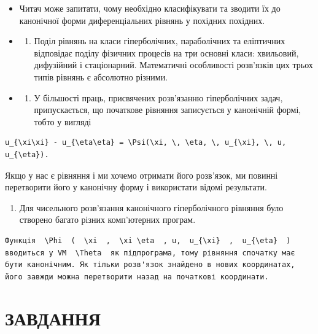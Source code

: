\documentclass[
  ukrainian,
]{article}
\providecommand{\tightlist}{%
  \setlength{\itemsep}{0pt}\setlength{\parskip}{0pt}}
\begin{document}
\begin{itemize}
\item
  Читач може запитати, чому необхідно класифікувати та зводити їх до
  канонічної форми диференціальних рівнянь у похідних похідних.
\item
  \begin{enumerate}
  \def\labelenumi{\alph{enumi})}
  \tightlist
  \item
    Поділ рівнянь на класи гіперболічних, параболічних та еліптичних
    відповідає поділу фізичних процесів на три основні класи: хвильовий,
    дифузійний і стаціонарний. Математичні особливості розв'язків цих
    трьох типів рівнянь є абсолютно різними.
  \end{enumerate}
\item
  \begin{enumerate}
  \def\labelenumi{\alph{enumi})}
  \setcounter{enumi}{1}
  \tightlist
  \item
    У більшості праць, присвячених розв'язанню гіперболічних задач,
    припускається, що початкове рівняння записується у канонічній формі,
    тобто у вигляді
  \end{enumerate}
\end{itemize}

\begin{verbatim}
u_{\xi\xi} - u_{\eta\eta} = \Psi(\xi, \, \eta, \, u_{\xi}, \, u, u_{\eta}).
\end{verbatim}

Якщо у нас є рівняння і ми хочемо отримати його розв'язок, ми повинні
перетворити його у канонічну форму і використати відомі результати.

\begin{enumerate}
\def\labelenumi{\alph{enumi})}
\setcounter{enumi}{2}
\tightlist
\item
  Для чисельного розв'язання канонічного гіперболічного рівняння було
  створено багато різних комп'ютерних програм.
\end{enumerate}

\begin{verbatim}
Функція  \Phi  (  \xi  ,  \xi \eta  , u,  u_{\xi}  ,  u_{\eta}  ) вводиться у VM  \Theta  як підпрограма, тому рівняння спочатку має бути канонічним. Як тільки розв'язок знайдено в нових координатах, його завжди можна перетворити назад на початкові координати.
\end{verbatim}

\section{ЗАВДАННЯ}\label{ux437ux430ux432ux434ux430ux43dux43dux44f-1}
\end{document}
